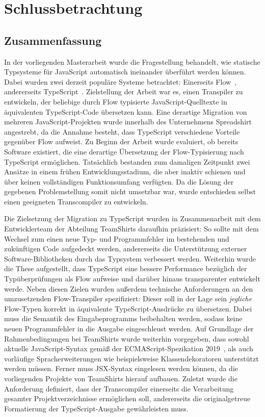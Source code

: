 \chapter{Schlussbetrachtung}
\label{chap:conclusion}

\section{Zusammenfassung}

In der vorliegenden Masterarbeit wurde die Fragestellung behandelt, wie statische Typsysteme für JavaScript automatisch ineinander überführt werden können. Dabei wurden zwei derzeit populäre Systeme betrachtet: Einerseits Flow~\autocite{FLOW:PAPER}, andererseits TypeScript~\autocite{TYPESCRIPT:SPEC}. Zielstellung der Arbeit war es, einen Transpiler zu entwickeln, der beliebige durch Flow typisierte JavaScript-Quelltexte in äquivalenten TypeScript-Code übersetzen kann. Eine derartige Migration von mehreren JavaScript-Projekten wurde innerhalb des Unternehmens Spreadshirt angestrebt, da die Annahme besteht, dass TypeScript verschiedene Vorteile gegenüber Flow aufweist. Zu Beginn der Arbeit wurde evaluiert, ob bereits Software existiert, die eine derartige Übersetzung der Flow-Typisierung nach TypeScript ermöglichen. Tatsächlich bestanden zum damaligen Zeitpunkt zwei Ansätze in einem frühen Entwicklungsstadium, die aber inaktiv schienen und über keinen vollständigen Funktionsumfang verfügten. Da die Lösung der gegebenen Problemstellung somit nicht umsetzbar war, wurde entschieden selbst einen geeigneten Transcompiler zu entwickeln.

Die Zielsetzung der Migration zu TypeScript wurden in Zusammenarbeit mit dem Entwicklerteam der Abteilung TeamShirts daraufhin präzisiert: So sollte mit dem Wechsel zum einen neue Typ- und Programmfehler im bestehenden und zukünftigen Code aufgedeckt werden, andererseits die Unterstützung externer Software-Bibliotheken durch das Typsystem verbessert werden. Weiterhin wurde die These aufgestellt, dass TypeScript eine bessere Performance bezüglich der Typüberprüfungen als Flow aufweise und darüber hinaus transparenter entwickelt werde. Neben diesen Zielen wurden außerdem technische Anforderungen an den umzusetzenden Flow-Transpiler spezifiziert: Dieser soll in der Lage sein \emph{jegliche} Flow-Typen korrekt in äquivalente TypeScript-Ausdrücke zu übersetzen. Dabei muss die Semantik des Eingabeprogramms beibehalten werden, sodass keine neuen Programmfehler in die Ausgabe eingeschleust werden. Auf Grundlage der Rahmenbedingungen bei TeamShirts wurde weiterhin vorgegeben, dass sowohl aktuelle JavaScript-Syntax gemäß der ECMAScript-Spezikation 2019~\autocite{ECMASCRIPT:2019}, als auch vorläufige Spracherweiterungen wie beispielsweise Klassendekoratoren unterstützt werden müssen. Ferner muss JSX-Syntax eingelesen werden können, da die vorliegenden Projekte von TeamShirts hierauf aufbauen. Zuletzt wurde die Anforderung definiert, dass der Transcompiler einerseits die Verarbeitung gesamter Projektverzeichnisse ermöglichen soll, andererseits die originalgetreue Formatierung der TypeScript-Ausgabe gewährleisten muss.

